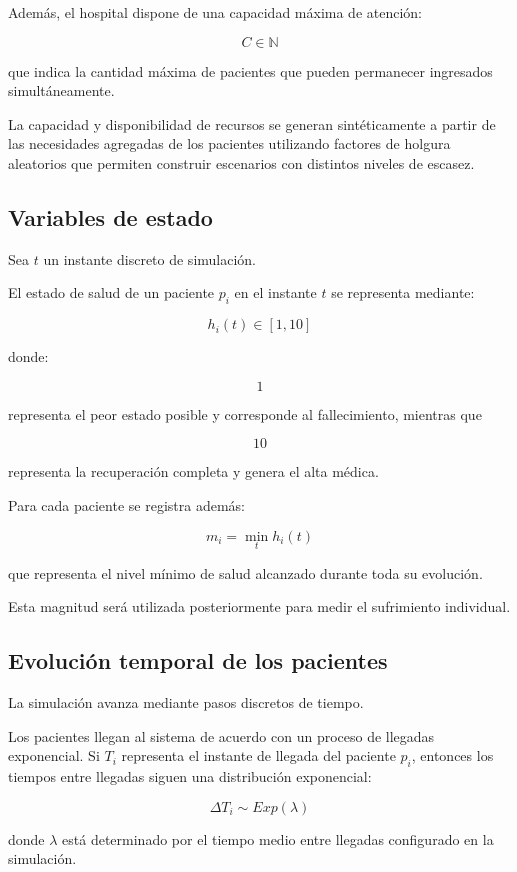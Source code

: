 \documentclass[12pt,a4paper]{article}
\begin{document}
Además, el hospital dispone de una capacidad máxima de atención:

\[
C \in \mathbb{N}
\]

que indica la cantidad máxima de pacientes que pueden permanecer ingresados simultáneamente.

La capacidad y disponibilidad de recursos se generan sintéticamente a partir de las necesidades agregadas de los pacientes utilizando factores de holgura aleatorios que permiten construir escenarios con distintos niveles de escasez.

\subsection{Variables de estado}

Sea \(t\) un instante discreto de simulación.

El estado de salud de un paciente \(p_i\) en el instante \(t\) se representa mediante:

\[
h_i(t)\in[1,10]
\]

donde:

\[
1
\]

representa el peor estado posible y corresponde al fallecimiento, mientras que

\[
10
\]

representa la recuperación completa y genera el alta médica.

Para cada paciente se registra además:

\[
m_i =
\min_t h_i(t)
\]

que representa el nivel mínimo de salud alcanzado durante toda su evolución.

Esta magnitud será utilizada posteriormente para medir el sufrimiento individual.

\subsection{Evolución temporal de los pacientes}

La simulación avanza mediante pasos discretos de tiempo.

Los pacientes llegan al sistema de acuerdo con un proceso de llegadas exponencial. Si \(T_i\) representa el instante de llegada del paciente \(p_i\), entonces los tiempos entre llegadas siguen una distribución exponencial:

\[
\Delta T_i
\sim
Exp(\lambda)
\]

donde \(\lambda\) está determinado por el tiempo medio entre llegadas configurado en la simulación.
\end{document}
